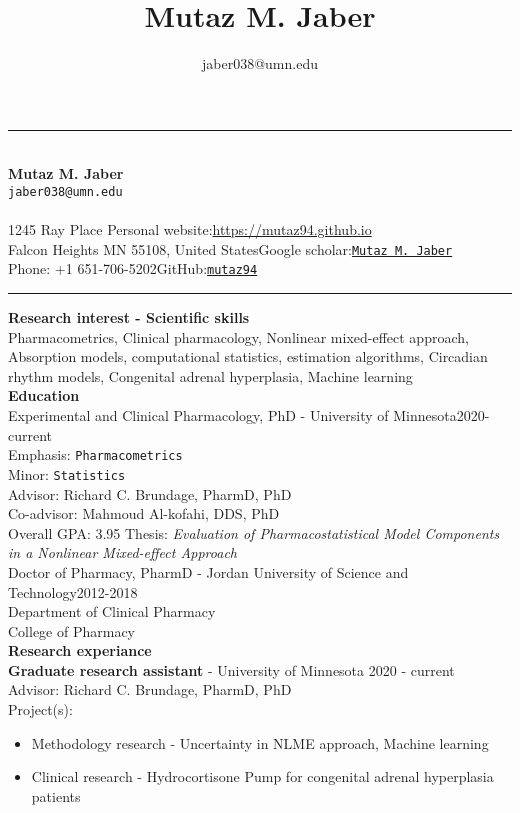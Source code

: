 \documentclass[a4paper,11pt]{article}
\title{\LARGE\bfseries Mutaz M. \textbf{Jaber}}
\author{jaber038@umn.edu}
\date{}
\begin{document}
\rule{\textwidth}{1pt}
~\\[0.5cm]
{\centering\textbf{\LARGE Mutaz M. Jaber}\\[0.1cm] \texttt{jaber038@umn.edu} \\[-0.2cm]}
~\\[0.1cm]
1245 Ray Place \hfill Personal website:\href{https://mutaz94.github.io/}{https://mutaz94.github.io}\\
Falcon Heights MN 55108, United States\hfill Google scholar:\href{https://scholar.google.com/citations?user=uugc-IgAAAAJ&hl=en&authuser=1}{\texttt{Mutaz M. Jaber}}\\
Phone: +1 651-706-5202\hfill GitHub:\href{https://github.com/Mutaz94}{\texttt{mutaz94}}\\
\rule{\textwidth}{1pt}

\textbf{Research interest - Scientific skills}\\
Pharmacometrics, Clinical pharmacology, Nonlinear mixed-effect approach, Absorption models, computational statistics, estimation algorithms, Circadian rhythm models, Congenital adrenal hyperplasia, Machine learning\\

\textbf{Education}\\[-0.3cm]

Experimental and Clinical Pharmacology, PhD - University of Minnesota\hfill 2020-current\\
Emphasis: \texttt{Pharmacometrics}\\
Minor: \texttt{Statistics}\\
Advisor: Richard C. Brundage, PharmD, PhD\\
Co-advisor: Mahmoud Al-kofahi, DDS, PhD\\
Overall GPA: 3.95
Thesis: \emph{Evaluation of Pharmacostatistical Model Components in a Nonlinear Mixed-effect Approach}   
~\\[0.5cm]
Doctor of Pharmacy, PharmD - Jordan University of Science and Technology\hfill 2012-2018\\
Department of Clinical Pharmacy\\
College of Pharmacy\\[1cm]

\textbf{Research experiance}\\[-0.3cm]


\textbf{Graduate research assistant} - University of Minnesota \hfill 2020 - current \\
Advisor: Richard C. Brundage, PharmD, PhD \\
Project(s):
\begin{itemize}
\item Methodology research - Uncertainty in NLME approach, Machine learning
\item Clinical research - Hydrocortisone Pump for congenital adrenal hyperplasia patients
\end{itemize}
\end{document}
